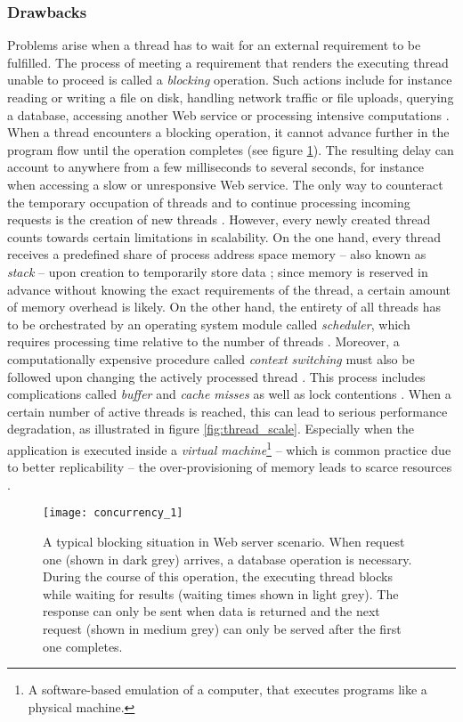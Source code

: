 \subsubsection*{Drawbacks}
Problems arise when a thread has to wait for an external requirement to be fulfilled. The process of meeting a requirement that renders the executing thread unable to proceed is called a \textit{blocking} operation. Such actions include for instance reading or writing a file on disk, handling network traffic or file uploads, querying a database, accessing another Web service or processing intensive computations \cite[p. 196]{Henderson2006}. When a thread encounters a blocking operation, it cannot advance further in the program flow until the operation completes (see figure \ref{fig:concurrency_1}). The resulting delay can account to anywhere from a few milliseconds to several seconds, for instance when accessing a slow or unresponsive Web service. The only way to counteract the temporary occupation of threads and to continue processing incoming requests is the creation of new threads \cite[p. 36]{Hughes-Croucher2012}. However, every newly created thread counts towards certain limitations in scalability. On the one hand, every thread receives a predefined share of process address space memory -- also known as \textit{stack} -- upon creation to temporarily store data \cite{Russinovich}; since memory is reserved in advance without knowing the exact requirements of the thread, a certain amount of memory overhead is likely. On the other hand, the entirety of all threads has to be orchestrated by an operating system module called \textit{scheduler}, which requires processing time relative to the number of threads \cite{Russinovich}. Moreover, a computationally expensive procedure called \textit{context switching} must also be followed upon changing the actively processed thread \cite{threads_vs_events}. This process includes complications called \textit{buffer} and \textit{cache misses} as well as lock contentions \cite[p. 2]{Welsh2001}. When a certain number of active threads is reached, this can lead to serious performance degradation, as illustrated in figure \ref{fig:thread_scale}. Especially when the application is executed inside a \textit{virtual machine}\footnote{A software-based emulation of a computer, that executes programs like a physical machine.} -- which is common practice due to better replicability -- the over-provisioning of memory leads to scarce resources \cite[p. 1]{Haller2006}.

\begin{figure}
\centering\small
\setlength{\tabcolsep}{0mm}
  \texttt{[image: concurrency\_1]}
\caption{
A typical blocking situation in Web server scenario. When request one (shown in dark grey) arrives, a database operation is necessary. During the course of this operation, the executing thread blocks while waiting for results (waiting times shown in light grey). The response can only be sent when data is returned and the next request (shown in medium grey) can only be served after the first one completes.
}
\label{fig:concurrency_1}
\end{figure}

